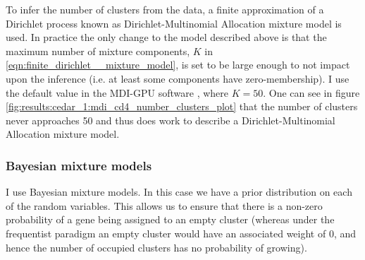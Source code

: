 \documentclass[12pt]{article} %
\begin{document}
	To infer the number of clusters from the data, a finite approximation of a Dirichlet process known as Dirichlet-Multinomial Allocation mixture model \citep{green2001modelling} is used. In practice the only change to the model described above is that the maximum  number  of mixture components, $K$ in \eqref{eqn:finite_dirichlet__mixture_model}, is set to be large enough to not impact upon the inference (i.e. at least some components have zero-membership). I use the default value in the MDI-GPU software \citep{MasonMDIGPUacceleratingintegrative2016a}, where $K=50$. One can see in figure \ref{fig:results:cedar_1:mdi_cd4_number_clusters_plot} that the number of clusters never approaches 50 and thus does work to describe a Dirichlet-Multinomial Allocation mixture model.
	

	
	\subsubsection{Bayesian mixture models}
	I use Bayesian mixture models. In this case we have a prior distribution on each of the random variables. This allows us to ensure that there is a non-zero probability of a gene being assigned to an empty cluster (whereas under the frequentist paradigm an empty cluster would have an associated weight of 0, and hence the number of occupied clusters has no probability of growing). 
	
\end{document}
